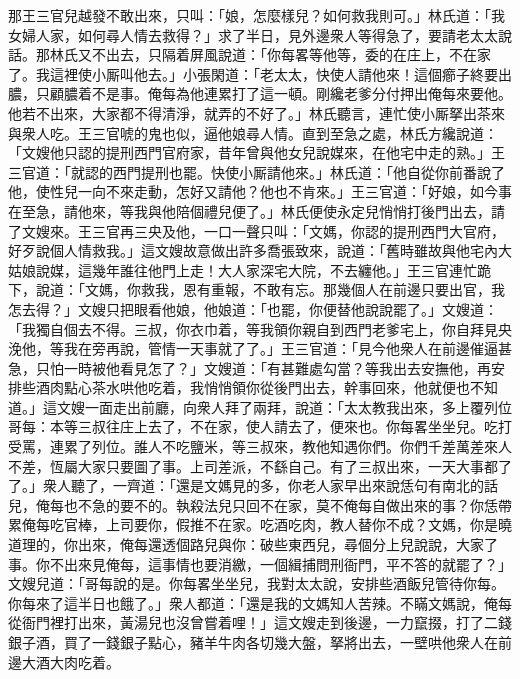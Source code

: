 那王三官兒越發不敢出來，只叫：「娘，怎麼樣兒？如何救我則可。」林氏道：「我女婦人家，如何尋人情去救得？」求了半日，見外邊衆人等得急了，要請老太太說話。那林氏又不出去，只隔着屏風說道：「你每畧等他等，委的在庄上，不在家了。我這裡使小厮叫他去。」小張閑道：「老太太，快使人請他來！這個癤子終要出膿，只顧膿着不是事。{}俺每為他連累打了這一頓。剛纔老爹分付押出俺每來要他。他若不出來，大家都不得清淨，就弄的不好了。」林氏聽言，連忙使小厮拏出茶來與衆人吃。王三官唬的鬼也似，逼他娘尋人情。{}直到至急之處，林氏方纔說道：「文嫂他只認的提刑西門官府家，昔年曾與他女兒說媒來，在他宅中走的熟。」王三官道：「就認的西門提刑也罷。快使小厮請他來。」林氏道：「他自從你前番說了他，使性兒一向不來走動，怎好又請他？他也不肯來。」王三官道：「好娘，如今事在至急，請他來，等我與他陪個禮兒便了。」{}林氏便使永定兒悄悄打後門出去，請了文嫂來。王三官再三央及他，一口一聲只叫：{}「文媽，你認的提刑西門大官府，好歹說個人情救我。」這文嫂故意做出許多喬張致來，說道：「舊時雖故與他宅內大姑娘說媒，這幾年誰往他門上走！大人家深宅大院，不去纏他。」王三官連忙跪下，{}說道：「文媽，你救我，恩有重報，不敢有忘。那幾個人在前邊只要出官，我怎去得？」文嫂只把眼看他娘，他娘道：「也罷，你便替他說說罷了。」文嫂道：「我獨自個去不得。三叔，你衣巾着，等我領你親自到西門老爹宅上，你自拜見央浼他，等我在旁再說，管情一天事就了了。」王三官道：「見今他衆人在前邊催逼甚急，只怕一時被他看見怎了？」文嫂道：「有甚難處勾當？等我出去安撫他，再安排些酒肉點心茶水哄他吃着，我悄悄領你從後門出去，幹事回來，他就便也不知道。」這文嫂一面走出前廳，向衆人拜了兩拜，說道：「太太教我出來，多上覆列位哥每：本等三叔往庄上去了，不在家，使人請去了，便來也。你每畧坐坐兒。吃打受罵，連累了列位。誰人不吃鹽米，等三叔來，教他知遇你們。你們千差萬差來人不差，恆屬大家只要圖了事。上司差派，不繇自己。有了三叔出來，一天大事都了了。」衆人聽了，一齊道：「還是文媽見的多，你老人家早出來說恁句有南北的話兒，俺每也不急的要不的。執殺法兒只回不在家，莫不俺每自做出來的事？你恁帶累俺每吃官棒，上司要你，假推不在家。吃酒吃肉，教人替你不成？文媽，你是曉道理的，你出來，俺每還透個路兒與你：破些東西兒，尋個分上兒說說，大家了事。你不出來見俺每，這事情也要消繳，一個緝捕問刑衙門，平不答的就罷了？」文嫂兒道：「哥每說的是。你每畧坐坐兒，我對太太說，安排些酒飯兒管待你每。你每來了這半日也餓了。」衆人都道：「還是我的文媽知人苦辣。不瞞文媽說，俺每從衙門裡打出來，黃湯兒也沒曾嘗着哩！」這文嫂走到後邊，一力竄掇，打了二錢銀子酒，買了一錢銀子點心，豬羊牛肉各切幾大盤，拏將出去，一壁哄他衆人在前邊大酒大肉吃着。

